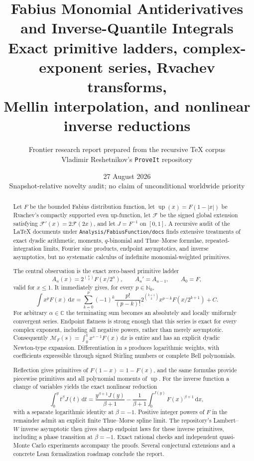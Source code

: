 \documentclass[11pt,oneside]{article}
\title{\bfseries Fabius Monomial Antiderivatives and Inverse-Quantile Integrals\\[0.45em]
\large Exact primitive ladders, complex-exponent series, Rvachev transforms,\\
Mellin interpolation, and nonlinear inverse reductions}
\author{Frontier research report prepared from the recursive TeX corpus\\
\small Vladimir Reshetnikov's \texttt{ProveIt} repository}
\date{27 August 2026\\
\small Snapshot-relative novelty audit; no claim of unconditional worldwide priority}
\numberwithin{equation}{section}
\theoremstyle{definition}
\theoremstyle{remark}
\newcommand{\C}{\mathbb C}
\newcommand{\N}{\mathbb N}
\newcommand{\Up}{\operatorname{up}}
\newcommand{\Mellin}{\mathcal M}
\newcommand{\InvF}{J}
\newcommand{\dd}{\,\mathrm d}
\newcommand{\repo}{\nolinkurl{Analysis/FabiusFunction/docs}}
\begin{document}
\maketitle

\begin{abstract}
Let $F$ be the bounded Fabius distribution function, let $\Up(x)=F(1-|x|)$ be
Rvachev's compactly supported even up-function, let $\mathcal F$ be the signed
global extension satisfying $\mathcal F'(x)=2\mathcal F(2x)$, and let
$\InvF=F^{-1}$ on $[0,1]$.  A recursive audit of the LaTeX documents under
\repo{} finds extensive treatments of exact dyadic arithmetic, moments,
$q$-binomial and Thue--Morse formulae, repeated-integration limits, Fourier sinc
products, endpoint asymptotics, and inverse asymptotics, but no systematic
calculus of indefinite monomial-weighted primitives.

The central observation is the exact zero-based primitive ladder
\[
 A_n(x)=2^{\binom n2}F(x/2^n),\qquad A_n'=A_{n-1},\qquad A_0=F,
\]
valid for $x\le1$.  It immediately gives, for every $p\in\N_0$,
\[
 \int x^pF(x)\dd x=
 \sum_{k=0}^{p}(-1)^k\frac{p!}{(p-k)!}
 2^{\binom{k+1}{2}}x^{p-k}F(x/2^{k+1})+C.
\]
For arbitrary $\alpha\in\C$ the terminating sum becomes an absolutely and
locally uniformly convergent series.  Endpoint flatness is strong enough that
this series is exact for every complex exponent, including all negative
powers, rather than merely asymptotic.  Consequently
$\Mellin_F(s)=\int_0^1x^{s-1}F(x)\dd x$ is entire and has an explicit dyadic
Newton-type expansion.  Differentiation in $s$ produces logarithmic weights,
with coefficients expressible through signed Stirling numbers or complete Bell
polynomials.

Reflection gives primitives of $F(1-x)=1-F(x)$, and the same formulas provide
piecewise primitives and all polynomial moments of $\Up$.  For the inverse
function a change of variables yields the exact nonlinear reduction
\[
 \int_0^y t^\beta\InvF(t)\dd t=
 \frac{y^{\beta+1}\InvF(y)}{\beta+1}
 -\frac1{\beta+1}\int_0^{\InvF(y)}F(x)^{\beta+1}\dd x,
\]
with a separate logarithmic identity at $\beta=-1$.  Positive integer powers of
$F$ in the remainder admit an explicit finite Thue--Morse spline limit.
The repository's Lambert--$W$ inverse asymptotic then gives sharp endpoint laws
for these inverse primitives, including a phase transition at $\beta=-1$.
Exact rational checks and independent quasi-Monte Carlo experiments accompany
the proofs.  Several conjectural extensions and a concrete Lean formalization
roadmap conclude the report.
\end{abstract}
\end{document}
